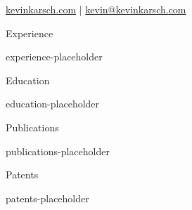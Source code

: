 


\geometry{top=1in, bottom=1in, left=1in, right=1in}

\hypersetup{colorlinks=true, allcolors=secondaryColor}



\centerline{}
\vspace{2pt}
\centerline{\href{https://kevinkarsch.com}{kevinkarsch.com} | \href{mailto:kevin@kevinkarsch.com}{kevin@kevinkarsch.com}}


\begin{cvSection}{Experience}

{{experience-placeholder}}

\end{cvSection}


\begin{cvSection}{Education}

{{education-placeholder}}

\end{cvSection}


\begin{cvSection}{Publications}

{{publications-placeholder}}

\end{cvSection}


\begin{cvSection}{Patents}

{{patents-placeholder}}

\end{cvSection}


